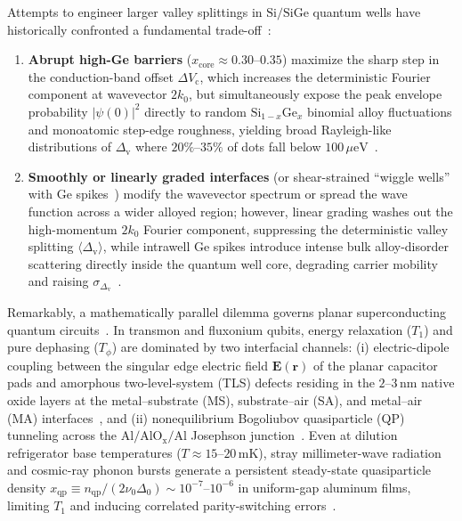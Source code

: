 \documentclass[11pt,letterpaper]{article}
\theoremstyle{definition}
\begin{document}
Attempts to engineer larger valley splittings in $\mathrm{Si/SiGe}$ quantum wells have historically confronted a fundamental trade-off~\cite{PaqueletWuetz2022, Losert2023, Lima2024}:
\begin{enumerate}
  \item \textbf{Abrupt high-Ge barriers} ($x_{\mathrm{core}} \approx 0.30$--$0.35$) maximize the sharp step in the conduction-band offset $\Delta V_{\mathrm{c}}$, which increases the deterministic Fourier component at wavevector $2k_0$, but simultaneously expose the peak envelope probability $|\psi(0)|^2$ directly to random $\mathrm{Si}_{1-x}\mathrm{Ge}_x$ binomial alloy fluctuations and monoatomic step-edge roughness, yielding broad Rayleigh-like distributions of $\Delta_{\mathrm{v}}$ where $20\%$--$35\%$ of dots fall below $100\,\mu\mathrm{eV}$~\cite{PaqueletWuetz2022, Losert2023}.
  \item \textbf{Smoothly or linearly graded interfaces} (or shear-strained ``wiggle wells'' with Ge spikes~\cite{McJunkin2022, Feng2022}) modify the wavevector spectrum or spread the wave function across a wider alloyed region; however, linear grading washes out the high-momentum $2k_0$ Fourier component, suppressing the deterministic valley splitting $\langle\Delta_{\mathrm{v}}\rangle$, while intrawell Ge spikes introduce intense bulk alloy-disorder scattering directly inside the quantum well core, degrading carrier mobility and raising $\sigma_{\Delta_{\mathrm{v}}}$~\cite{Losert2023}.
\end{enumerate}

Remarkably, a mathematically parallel dilemma governs planar superconducting quantum circuits~\cite{Martinis2005, Muller2019, Glazman2021, Catelani2011}. In transmon and fluxonium qubits, energy relaxation ($T_1$) and pure dephasing ($T_\phi$) are dominated by two interfacial channels: (i) electric-dipole coupling between the singular edge electric field $\mathbf{E}(\mathbf{r})$ of the planar capacitor pads and amorphous two-level-system (TLS) defects residing in the $2$--$3\,\mathrm{nm}$ native oxide layers at the metal--substrate (MS), substrate--air (SA), and metal--air (MA) interfaces~\cite{Wang2015, Woods2019, Place2021}, and (ii) nonequilibrium Bogoliubov quasiparticle (QP) tunneling across the $\mathrm{Al/AlO_x/Al}$ Josephson junction~\cite{Catelani2011, Serniak2018, Pan2022, Connolly2024}. Even at dilution refrigerator base temperatures ($T \approx 15$--$20\,\mathrm{mK}$), stray millimeter-wave radiation and cosmic-ray phonon bursts generate a persistent steady-state quasiparticle density $x_{\mathrm{qp}} \equiv n_{\mathrm{qp}}/(2\nu_0 \Delta_0) \sim 10^{-7}$--$10^{-6}$ in uniform-gap aluminum films, limiting $T_1$ and inducing correlated parity-switching errors~\cite{Vepsalainen2020, McEwen2022}.
\end{document}
